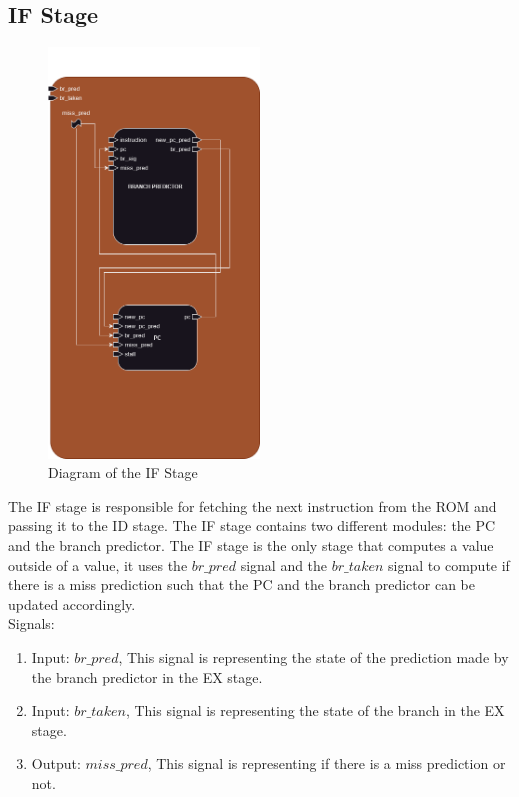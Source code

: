 \subsection{IF Stage}

\begin{figure}[H]
\centering
\includegraphics[width=0.5\textwidth]{../diagrams/fetch/if_stage.png}
\caption{Diagram of the IF Stage}
\label{fig:IF_Stage}
\end{figure}

The IF stage is responsible for fetching the next instruction from the ROM and passing it to the ID stage. 
The IF stage contains two different modules: the PC and the branch predictor.
The IF stage is the only stage that computes a value outside of a value, it uses the $br\_pred$ signal and the 
$br\_taken$ signal to compute if there is a miss prediction such that the PC and the branch predictor can be updated
accordingly. \\

Signals:
\begin{enumerate}
    \item Input: $br\_pred$, This signal is representing the state of the prediction made by the branch predictor in the EX stage.
    \item Input: $br\_taken$, This signal is representing the state of the branch in the EX stage.
    \item Output: $miss\_pred$, This signal is representing if there is a miss prediction or not.
\end{enumerate}
